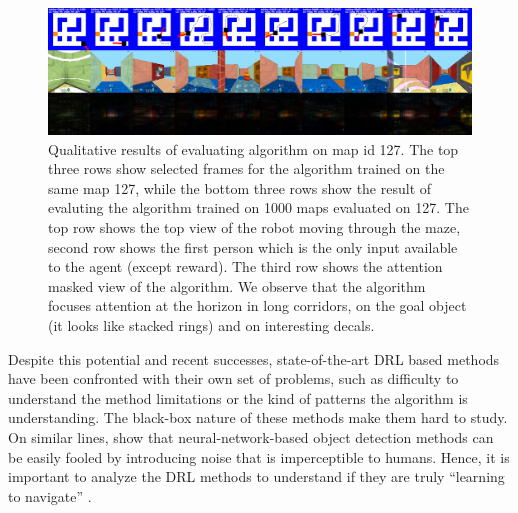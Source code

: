 \begin{figure}
\includegraphics[width=\textwidth]{./exp-results/training-09x09-0127-on-0127.png}
\caption{Qualitative results of evaluating algorithm on map id 127. The top three rows show selected frames for the algorithm trained on the same map 127, while the bottom three rows show the result of evaluting the algorithm trained on 1000 maps evaluated on 127. The top row shows the top view of the robot moving through the maze, second row shows the first person which is the only input available to the agent (except reward). The third row shows the attention masked view of the algorithm. We observe that the algorithm focuses attention at the horizon in long corridors, on the goal object (it looks like stacked rings) and on interesting decals.}
\label{fig:training-qualitative}
\end{figure}

Despite this potential and recent successes, 
state-of-the-art DRL based methods have been confronted with their own set of problems, such as difficulty to understand the method limitations or the kind of patterns the algorithm is understanding.  The black-box nature of these methods make them hard to study.
On similar lines, \cite{NgYoClCVPR2015} show that neural-network-based object detection methods can be easily fooled by introducing noise that is imperceptible to humans. Hence, it is important to analyze the DRL methods to understand if they are truly ``learning to navigate'' \cite{MiPaViICLR2017}.


